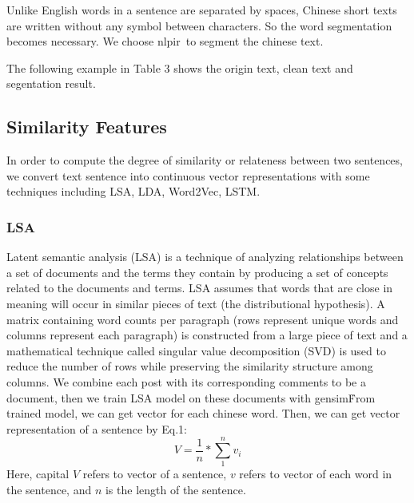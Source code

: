 \documentclass{llncs}
\begin{document}
Unlike English words in a sentence are separated by spaces, Chinese short texts 
are written without any symbol between characters. So the word segmentation 
becomes necessary. We choose nlpir\footnotemark\ to segment the chinese text.

The following example in Table 3 shows the origin text, clean text and 
segentation result.


\subsection{Similarity Features}
In order to compute the degree of similarity or relateness between two 
sentences, we convert text sentence into continuous vector representations 
with some techniques including LSA, LDA, Word2Vec, LSTM.

\subsubsection{LSA}
Latent semantic analysis (LSA) is a technique of analyzing relationships between a set of documents and the terms they contain by producing a set of concepts related to the documents and terms. LSA assumes that words that are close in meaning will occur in similar pieces of text (the distributional hypothesis). A matrix containing word counts per paragraph (rows represent unique words and columns represent each paragraph) is constructed from a large piece of text and a mathematical technique called singular value decomposition (SVD) is used to reduce the number of rows while preserving the similarity structure among columns. We combine each post with its corresponding comments to be a document, then we train LSA model on these documents with gensim\footnotemark\. From trained model, we can get vector for each chinese word.
Then, we can get vector representation of a sentence by Eq.1:
\begin{equation}
   V = \frac{1}{n} * \sum_1^n v_i 
\end{equation}
Here, capital $V$ refers to vector of a sentence, $v$ refers to vector of each word in the sentence, and $n$ is the length of the sentence.

\end{document}
